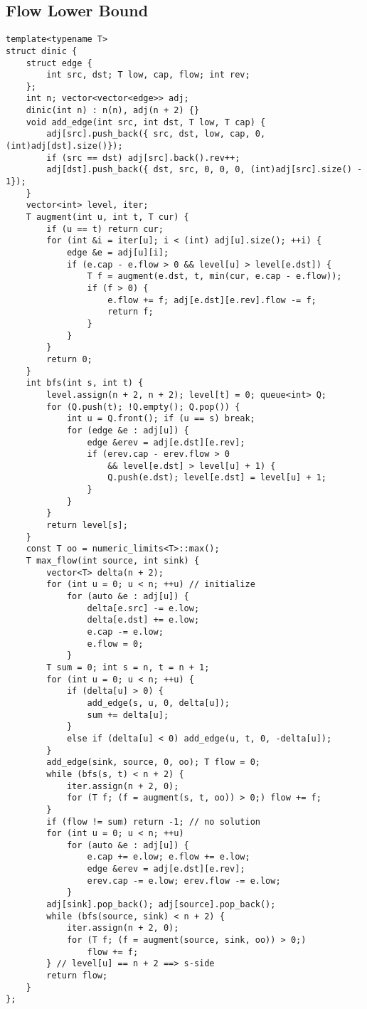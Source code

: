 \documentclass[landscape, 8pt, a4paper, oneside]{extarticle}
\begin{document}
\begin{multicols}{3}
\subsection{Flow Lower Bound}
\begin{verbatim}
template<typename T>
struct dinic {
    struct edge {
        int src, dst; T low, cap, flow; int rev;
    };
    int n; vector<vector<edge>> adj;
    dinic(int n) : n(n), adj(n + 2) {}
    void add_edge(int src, int dst, T low, T cap) {
        adj[src].push_back({ src, dst, low, cap, 0, (int)adj[dst].size()});
        if (src == dst) adj[src].back().rev++;
        adj[dst].push_back({ dst, src, 0, 0, 0, (int)adj[src].size() - 1});
    }
    vector<int> level, iter;
    T augment(int u, int t, T cur) {
        if (u == t) return cur;
        for (int &i = iter[u]; i < (int) adj[u].size(); ++i) {
            edge &e = adj[u][i];
            if (e.cap - e.flow > 0 && level[u] > level[e.dst]) {
                T f = augment(e.dst, t, min(cur, e.cap - e.flow));
                if (f > 0) {
                    e.flow += f; adj[e.dst][e.rev].flow -= f;
                    return f;
                }
            }
        }
        return 0;
    }
    int bfs(int s, int t) {
        level.assign(n + 2, n + 2); level[t] = 0; queue<int> Q;
        for (Q.push(t); !Q.empty(); Q.pop()) {
            int u = Q.front(); if (u == s) break;
            for (edge &e : adj[u]) {
                edge &erev = adj[e.dst][e.rev];
                if (erev.cap - erev.flow > 0
                    && level[e.dst] > level[u] + 1) {
                    Q.push(e.dst); level[e.dst] = level[u] + 1;
                }
            }
        }
        return level[s];
    }
    const T oo = numeric_limits<T>::max();
    T max_flow(int source, int sink) {
        vector<T> delta(n + 2);
        for (int u = 0; u < n; ++u) // initialize
            for (auto &e : adj[u]) {
                delta[e.src] -= e.low;
                delta[e.dst] += e.low;
                e.cap -= e.low;
                e.flow = 0;
            }
        T sum = 0; int s = n, t = n + 1;
        for (int u = 0; u < n; ++u) {
            if (delta[u] > 0) {
                add_edge(s, u, 0, delta[u]);
                sum += delta[u];
            }
            else if (delta[u] < 0) add_edge(u, t, 0, -delta[u]);
        }
        add_edge(sink, source, 0, oo); T flow = 0;
        while (bfs(s, t) < n + 2) {
            iter.assign(n + 2, 0);
            for (T f; (f = augment(s, t, oo)) > 0;) flow += f;
        }
        if (flow != sum) return -1; // no solution
        for (int u = 0; u < n; ++u)
            for (auto &e : adj[u]) {
                e.cap += e.low; e.flow += e.low;
                edge &erev = adj[e.dst][e.rev];
                erev.cap -= e.low; erev.flow -= e.low;
            }
        adj[sink].pop_back(); adj[source].pop_back();
        while (bfs(source, sink) < n + 2) {
            iter.assign(n + 2, 0);
            for (T f; (f = augment(source, sink, oo)) > 0;)
                flow += f;
        } // level[u] == n + 2 ==> s-side
        return flow;
    }
};
\end{verbatim}

\end{multicols}
\end{document}
